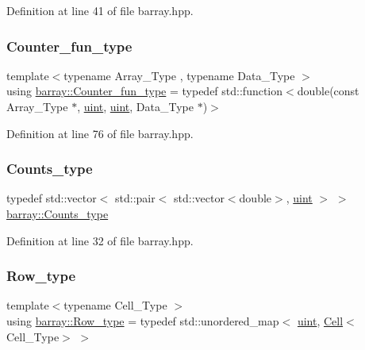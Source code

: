 Definition at line 41 of file barray.\+hpp.

\mbox{\label{namespacebarray_a94903bd0f37708633933ea88ac8e4c6a}} 
\subsubsection{\texorpdfstring{Counter\+\_\+fun\+\_\+type}{Counter\_fun\_type}}
{\footnotesize\ttfamily template$<$typename Array\+\_\+\+Type , typename Data\+\_\+\+Type $>$ \\
using \hyperlink{namespacebarray_a94903bd0f37708633933ea88ac8e4c6a}{barray\+::\+Counter\+\_\+fun\+\_\+type} = typedef std\+::function$<$double(const Array\+\_\+\+Type $\ast$, \hyperlink{namespacebarray_af9756a31953db233f80a9cfe1ef31c32}{uint}, \hyperlink{namespacebarray_af9756a31953db233f80a9cfe1ef31c32}{uint}, Data\+\_\+\+Type $\ast$)$>$}



Definition at line 76 of file barray.\+hpp.

\mbox{\label{namespacebarray_a402b1982cc07118fb03b259b3fbe6b13}} 
\subsubsection{\texorpdfstring{Counts\+\_\+type}{Counts\_type}}
{\footnotesize\ttfamily typedef std\+::vector$<$ std\+::pair$<$ std\+::vector$<$double$>$, \hyperlink{namespacebarray_af9756a31953db233f80a9cfe1ef31c32}{uint} $>$ $>$ \hyperlink{namespacebarray_a402b1982cc07118fb03b259b3fbe6b13}{barray\+::\+Counts\+\_\+type}}



Definition at line 32 of file barray.\+hpp.

\mbox{\label{namespacebarray_ab4f74265365989ae59858a57ddfa92a7}} 
\subsubsection{\texorpdfstring{Row\+\_\+type}{Row\_type}}
{\footnotesize\ttfamily template$<$typename Cell\+\_\+\+Type $>$ \\
using \hyperlink{namespacebarray_ab4f74265365989ae59858a57ddfa92a7}{barray\+::\+Row\+\_\+type} = typedef std\+::unordered\+\_\+map$<$ \hyperlink{namespacebarray_af9756a31953db233f80a9cfe1ef31c32}{uint}, \hyperlink{classbarray_1_1_cell}{Cell}$<$Cell\+\_\+\+Type$>$ $>$}




